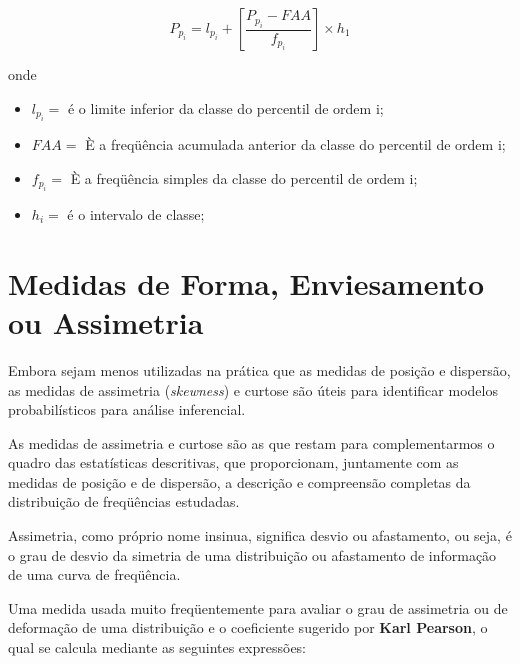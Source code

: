 \begin{equation}\label{}
    P_{p_{i}}= l_{p_{i}}+\left[\frac{P_{p_{i}}-FAA}{f_{p_{i}}}\right]\times h_{1}
\end{equation}

 onde

 \begin{itemize}
   \item $l_{p_{i}}=$ é o limite inferior da classe do percentil de ordem i;
   \item $FAA=$ È a freqüência acumulada anterior da classe do percentil de ordem i;
   \item $f_{p_{i}}=$ È a freqüência simples da classe do percentil de ordem i;
   \item $h_{i}=$ é o intervalo de classe;
 \end{itemize}



\section{Medidas de Forma, Enviesamento ou Assimetria }

Embora sejam menos utilizadas na prática que as medidas de posição e dispersão, as medidas de assimetria (\textit{skewness}) e curtose são úteis para identificar modelos probabilísticos para análise inferencial.\vskip0.3cm

As medidas de assimetria e curtose são as que restam para complementarmos o quadro das estatísticas descritivas, que proporcionam, juntamente com as medidas de posição e de dispersão, a descrição e compreensão completas da distribuição de freqüências estudadas.\vskip0.3cm

Assimetria, como próprio nome insinua, significa desvio ou afastamento, ou seja, é o grau de desvio da simetria de uma distribuição ou afastamento de informação de uma curva de freqüência.\vskip0.3cm





Uma medida usada muito freqüentemente para avaliar o grau de assimetria ou de deformação de uma distribuição e o coeficiente sugerido por \textbf{Karl Pearson}, o qual se calcula mediante as seguintes expressões:

